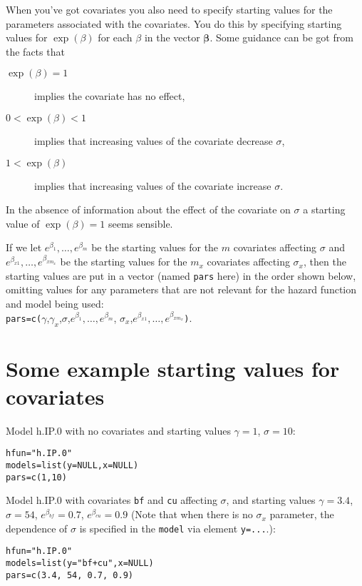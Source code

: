 \documentclass{article}
\begin{document}
When you've got covariates you also need to specify starting values for the parameters associated with the covariates. You do this by specifying starting values for $\exp(\beta)$ for each $\beta$ in the vector $\boldsymbol{\beta}$. Some guidance can be got from the facts that

\begin{description}
\item[$\exp(\beta)=1$] implies the covariate has no effect,
\item[$0<\exp(\beta)<1$] implies that increasing values of the covariate decrease $\sigma$,
\item[$1<\exp(\beta)$] implies that increasing values of the covariate increase $\sigma$.
\end{description}

In the absence of information about the effect of the covariate on $\sigma$ a starting value of $\exp(\beta)=1$ seems sensible. 

If we let $e^{\beta_{1}},\ldots,e^{\beta_{m}}$ be the starting values for the $m$ covariates affecting $\sigma$ and $e^{\beta_{x1}},\ldots,e^{\beta_{xm_x}}$ be the starting values for the $m_x$ covariates affecting $\sigma_x$, then the starting values are put in a vector (named \verb|pars| here) in the order shown below, omitting values for any parameters that are not relevant for the hazard function and model being used:\\
\verb|pars=c(|$\gamma$,$\gamma_x$,$\sigma$,$e^{\beta_{1}},\ldots,e^{\beta_{m}}$, $\sigma_x$,$e^{\beta_{x1}},\ldots,e^{\beta_{xm_x}}$\verb|)|. 



\section{Some example starting values for covariates}

Model h.IP.0 with no covariates and starting values $\gamma=1$, $\sigma=10$:
\begin{verbatim}
hfun="h.IP.0"
models=list(y=NULL,x=NULL)
pars=c(1,10)
\end{verbatim}

\noindent
Model h.IP.0 with covariates \verb|bf| and \verb|cu| affecting $\sigma$, and starting values $\gamma=3.4$, $\sigma=54$, $e^{\beta_{bf}}=0.7$, $e^{\beta_{cu}}=0.9$ (Note that when there is no $\sigma_x$ parameter, the dependence of $\sigma$ is specified in the \verb|model| via element \verb|y=...|.):
\begin{verbatim}
hfun="h.IP.0"
models=list(y="bf+cu",x=NULL)
pars=c(3.4, 54, 0.7, 0.9)
\end{verbatim}
\end{document}
